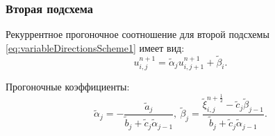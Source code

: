 \documentclass[12pt, a4paper]{report}
\begin{document}
	\subsubsection*{Вторая подсхема}
	\large
	Рекуррентное прогоночное соотношение для второй подсхемы \eqref{eq:variableDirectionsScheme1} имеет вид:
	\begin{equation*}
		u_{i, j}^{n+1} = \tilde{\alpha}_{j}u_{i, j+1}^{n+1} + \tilde{\beta}_{i}.
	\end{equation*}
	\par
	Прогоночные коэффициенты:
	\begin{equation*}
		\tilde{\alpha}_{j} = -\frac{\tilde{a}_{j}}{\tilde{b}_{j} + \tilde{c}_{j}\tilde{\alpha}_{j-1}}, \> \tilde{\beta}_{j} = \frac{\tilde{\xi}_{i, j}^{n+\frac{1}{2}} - \tilde{c}_{j}\tilde{\beta}_{j-1}}{\tilde{b}_{j} + \tilde{c}_{j}\tilde{\alpha}_{j-1}}.
	\end{equation*}
\end{document}
